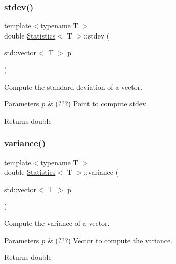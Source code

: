\subsubsection{\texorpdfstring{stdev()}{stdev()}}
{\footnotesize\ttfamily template$<$typename T $>$ \\
double \mbox{\hyperlink{class_statistics}{Statistics}}$<$ T $>$\+::stdev (\begin{DoxyParamCaption}\item[{std\+::vector$<$ T $>$}]{p }\end{DoxyParamCaption})\hspace{0.3cm}{\ttfamily [static]}}



Compute the standard deviation of a vector. 


\begin{DoxyParams}{Parameters}
{\em p} & (???) \mbox{\hyperlink{class_point}{Point}} to compute stdev. \\
\hline
\end{DoxyParams}
\begin{DoxyReturn}{Returns}
double 
\end{DoxyReturn}
\mbox{\label{class_statistics_a9e5a038712e910978ee5c6dd3c16d0ee}} 
\subsubsection{\texorpdfstring{variance()}{variance()}\hspace{0.1cm}{\footnotesize\ttfamily [1/2]}}
{\footnotesize\ttfamily template$<$typename T $>$ \\
double \mbox{\hyperlink{class_statistics}{Statistics}}$<$ T $>$\+::variance (\begin{DoxyParamCaption}\item[{std\+::vector$<$ T $>$}]{p }\end{DoxyParamCaption})\hspace{0.3cm}{\ttfamily [static]}}



Compute the variance of a vector. 


\begin{DoxyParams}{Parameters}
{\em p} & (???) Vector to compute the variance. \\
\hline
\end{DoxyParams}
\begin{DoxyReturn}{Returns}
double 
\end{DoxyReturn}
\mbox{\label{class_statistics_a02f605eec578754e63de82acce5a3f34}} 
